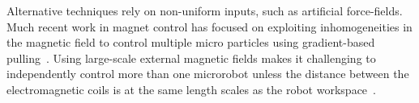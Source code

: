 




Alternative techniques rely on non-uniform inputs, such as artificial force-fields. 
Much recent work in magnet control has focused on exploiting inhomogeneities in the magnetic field to control multiple micro particles using gradient-based pulling~\cite{Salmanipour2018EightDOF,Denasi2018independent}.  
Using large-scale external magnetic fields makes it challenging to independently control more than one microrobot unless the distance between the electromagnetic coils is at the same length scales as the robot workspace~\cite{diller2016six, Denasi2018independent, Salmanipour2018EightDOF }.


